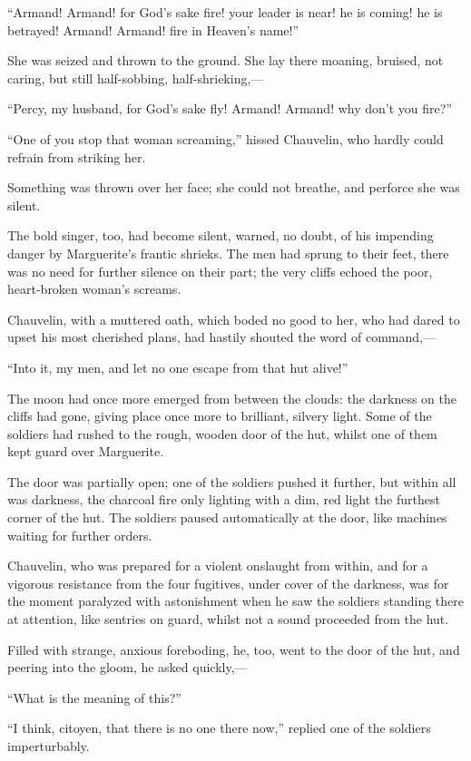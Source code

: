 \documentclass[paper=a5,BCOR=7mm,twoside,DIV=calc,12pt,usegeometry,chapterprefix,endperiod,headings=big]{scrbook}
\begin{document}
\enquote{Armand! Armand! for God's sake fire! your leader is near! he is coming! he is betrayed! Armand! Armand! fire in Heaven's name!}

She was seized and thrown to the ground. She lay there moaning, bruised, not caring, but still half-sobbing, half-shrieking,---

\enquote{Percy, my husband, for God's sake fly! Armand! Armand! why don't you fire?}

\enquote{One of you stop that woman screaming,} hissed Chauvelin, who hardly could refrain from striking her.

Something was thrown over her face; she could not breathe, and perforce she was silent.

The bold singer, too, had become silent, warned, no doubt, of his impending danger by Marguerite's frantic shrieks. The men had sprung to their feet, there was no need for further silence on their part; the very cliffs echoed the poor, heart-broken woman's screams.

Chauvelin, with a muttered oath, which boded no good to her, who had dared to upset his most cherished plans, had hastily shouted the word of command,---

\enquote{Into it, my men, and let no one escape from that hut alive!}

The moon had once more emerged from between the clouds: the darkness on the cliffs had gone, giving place once more to brilliant, silvery light. Some of the soldiers had rushed to the rough, wooden door of the hut, whilst one of them kept guard over Marguerite.

The door was partially open; one of the soldiers pushed it further, but within all was darkness, the charcoal fire only lighting with a dim, red light the furthest corner of the hut. The soldiers paused automatically at the door, like machines waiting for further orders.

Chauvelin, who was prepared for a violent onslaught from within, and for a vigorous resistance from the four fugitives, under cover of the darkness, was for the moment paralyzed with astonishment when he saw the soldiers standing there at attention, like sentries on guard, whilst not a sound proceeded from the hut.

Filled with strange, anxious foreboding, he, too, went to the door of the hut, and peering into the gloom, he asked quickly,---

\enquote{What is the meaning of this?}

\enquote{I think, citoyen, that there is no one there now,} replied one of the soldiers imperturbably.
\end{document}
